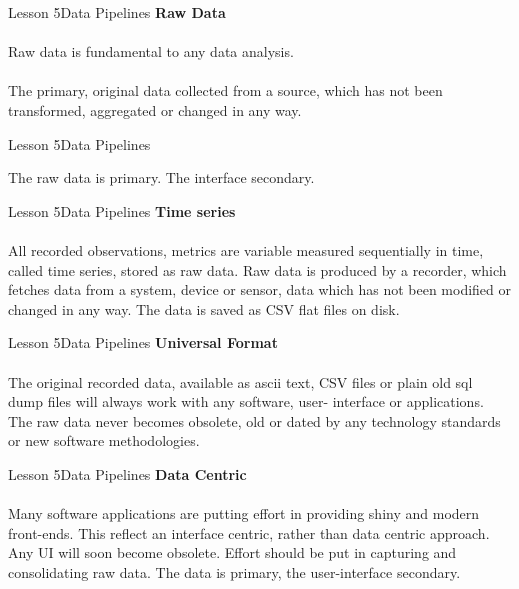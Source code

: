\documentclass[aspectratio=1610]{beamer}
\begin{document}
\begin{frame}{Lesson 5}{Data Pipelines}
\LARGE
\textbf{Raw Data}\\~\\
Raw data is fundamental to any data analysis.\\~\\
The primary, original data collected from a source, which has not
been transformed, aggregated or changed in any way.
\end{frame}



\begin{frame}{Lesson 5}{Data Pipelines}
\Huge
\begin{center}
The raw data is primary. The interface secondary.
\end{center}
\end{frame}



\begin{frame}{Lesson 5}{Data Pipelines}
\LARGE
\textbf{Time series}\\~\\
All recorded observations, metrics are variable measured
sequentially in time, called time series, stored as raw data. Raw
data is produced by a recorder, which fetches data from a system,
device or sensor, data which has not been modified or changed in any
way. The data is saved as CSV flat files on disk.
\end{frame}



\begin{frame}{Lesson 5}{Data Pipelines}
\LARGE
\textbf{Universal Format}\\~\\
The original recorded data, available as ascii text, CSV files or 
plain old sql dump files will always work with any software, user-
interface or applications. The raw data never becomes obsolete, old 
or dated by any technology standards or new software methodologies.
\end{frame}



\begin{frame}{Lesson 5}{Data Pipelines}
\LARGE
\textbf{Data Centric}\\~\\
Many software applications are putting effort in providing shiny and 
modern front-ends. This reflect an interface centric, rather than 
data centric approach. Any UI will soon become obsolete. Effort 
should be put in capturing and consolidating raw data. The data is 
primary, the user-interface secondary.
\end{frame}
\end{document}
